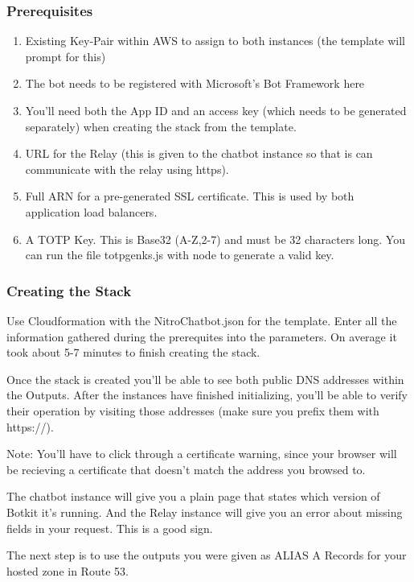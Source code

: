 \documentclass[onecolumn, draftclsnofoot,10pt, compsoc]{IEEEtran}
\begin{document}
\subsubsection{Prerequisites}
\begin{enumerate}
    \item Existing Key-Pair within AWS to assign to both instances (the template will prompt for this)
    \item The bot needs to be registered with Microsoft's Bot Framework here
    \item You'll need both the App ID and an access key (which needs to be generated separately) when creating the stack from the template.
    \item URL for the Relay (this is given to the chatbot instance so that is can communicate with the relay using https).
    \item Full ARN for a pre-generated SSL certificate. This is used by both application load balancers.
    \item A TOTP Key. This is Base32 (A-Z,2-7) and must be 32 characters long. You can run the file totpgenks.js with node to generate a valid key.
\end{enumerate}

\subsubsection{Creating the Stack}
Use Cloudformation with the NitroChatbot.json for the template. Enter all the information gathered during the prerequites into the parameters. On average it took about 5-7 minutes to finish creating the stack.

Once the stack is created you'll be able to see both public DNS addresses within the Outputs. After the instances have finished initializing, you'll be able to verify their operation by visiting those addresses (make sure you prefix them with https://).

Note: You'll have to click through a certificate warning, since your browser will be recieving a certificate that doesn't match the address you browsed to.

The chatbot instance will give you a plain page that states which version of Botkit it's running. And the Relay instance will give you an error about missing fields in your request. This is a good sign.

The next step is to use the outputs you were given as ALIAS A Records for your hosted zone in Route 53.
\end{document}
